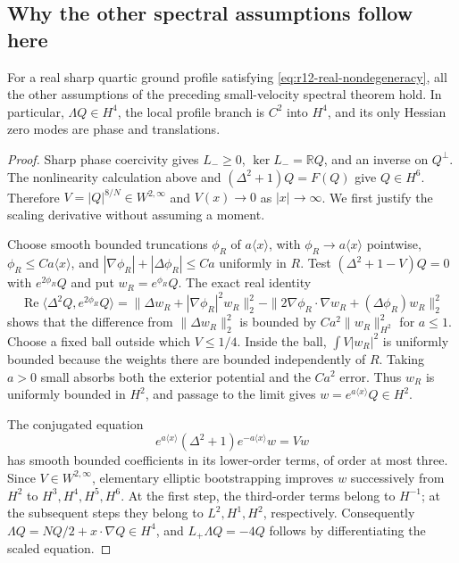 \subsection{Why the other spectral assumptions follow here}

\begin{lemma}
\label{lem:r12-branch}
For a real sharp quartic ground profile satisfying
\eqref{eq:r12-real-nondegeneracy}, all the other assumptions of the
preceding small-velocity spectral theorem hold. In particular,
$\Lambda Q\in H^4$, the local profile branch is $C^2$ into $H^4$,
and its only Hessian zero modes are phase and translations.
\end{lemma}
\begin{proof}
Sharp phase coercivity gives $L_-\ge0$, $\ker L_-=\mathbb RQ$,
and an inverse on $Q^\perp$. The nonlinearity calculation above and
$(\Delta^2+1)Q=F(Q)$ give $Q\in H^6$. Therefore
$V=|Q|^{8/N}\in W^{2,\infty}$ and $V(x)\to0$ as $|x|\to\infty$.
We first justify the scaling derivative without assuming a moment.

Choose smooth bounded truncations $\phi_R$ of
$a\langle x\rangle$, with $\phi_R\to a\langle x\rangle$ pointwise,
$\phi_R\le Ca\langle x\rangle$, and
$|\nabla\phi_R|+|\Delta\phi_R|\le Ca$ uniformly in $R$.
Test $(\Delta^2+1-V)Q=0$ with $e^{2\phi_R}Q$ and put
$w_R=e^{\phi_R}Q$. The exact real identity
\[
 \operatorname{Re}\langle\Delta^2Q,e^{2\phi_R}Q\rangle
 =\|\Delta w_R+|\nabla\phi_R|^2w_R\|_2^2
  -\|2\nabla\phi_R\cdot\nabla w_R+(\Delta\phi_R)w_R\|_2^2
\]
shows that the difference from $\|\Delta w_R\|_2^2$ is bounded by
$Ca^2\|w_R\|_{H^2}^2$ for $a\le1$.
Choose a fixed ball outside which $V\le1/4$. Inside the ball,
$\int V|w_R|^2$ is uniformly bounded because the weights there are
bounded independently of $R$. Taking $a>0$ small absorbs both the
exterior potential and the $Ca^2$ error. Thus $w_R$ is uniformly
bounded in $H^2$, and passage to the limit gives
$w=e^{a\langle x\rangle}Q\in H^2$.

The conjugated equation
\[
 e^{a\langle x\rangle}(\Delta^2+1)e^{-a\langle x\rangle}w=Vw
\]
has smooth bounded coefficients in its lower-order terms, of order at
most three. Since $V\in W^{2,\infty}$, elementary elliptic bootstrapping
improves $w$ successively from $H^2$ to $H^3,H^4,H^5,H^6$.
At the first step, the third-order terms belong to $H^{-1}$; at the
subsequent steps they belong to $L^2,H^1,H^2$, respectively.
Consequently $\Lambda Q=NQ/2+x\cdot\nabla Q\in H^4$, and
$L_+\Lambda Q=-4Q$ follows by differentiating the scaled equation.


\end{proof}
